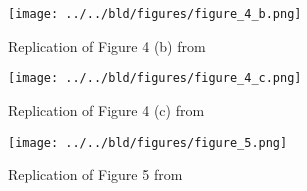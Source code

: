 \documentclass[11pt, a4paper, leqno]{article}
\begin{document}
\begin{figure}[H]
\texttt{[image: ../../bld/figures/figure\_4\_b.png]}
\caption{Replication of Figure 4 (b) from \cite{dellavigna2018motivates}}
\end{figure}

\begin{figure}[H]
\texttt{[image: ../../bld/figures/figure\_4\_c.png]}
\caption{Replication of Figure 4 (c) from \cite{dellavigna2018motivates}}
\end{figure}

\begin{figure}[H]
\texttt{[image: ../../bld/figures/figure\_5.png]}
\caption{Replication of Figure 5 from \cite{dellavigna2018motivates}}
\end{figure}



\printbibliography
{}





\end{document}
